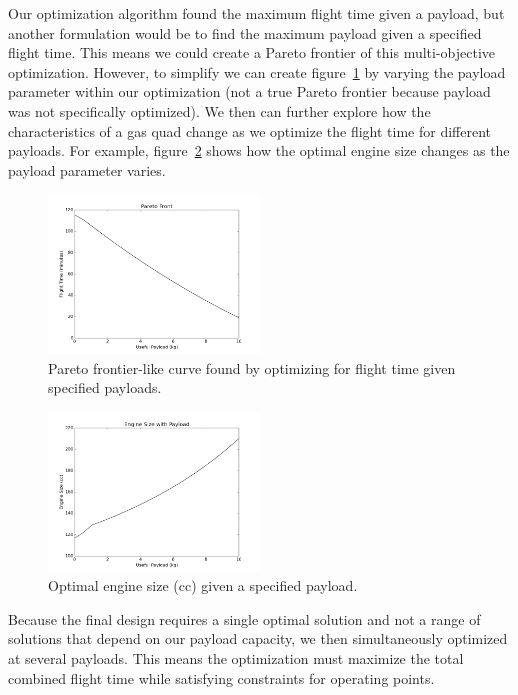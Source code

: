 \documentclass[letterpaper, 10 pt, conference]{ieeeconf}  %
\begin{document}
Our optimization algorithm found the maximum flight time given a payload, but another formulation would be to find the maximum payload given a specified flight time. This means we could create a Pareto frontier of this multi-objective optimization. However, to simplify we can create figure~\ref{fig:payload} by varying the payload parameter within our optimization (not a true Pareto frontier because payload was not specifically optimized). We then can further explore how the characteristics of a gas quad change as we optimize the flight time for different payloads. For example, figure~\ref{fig:eng_v_pl} shows how the optimal engine size changes as the payload parameter varies. 

\begin{figure}
	\includegraphics[width=0.5\textwidth]{pareto_front.png}
	\caption{Pareto frontier-like curve found by optimizing for flight time given specified payloads.}
		\label{fig:payload}
\end{figure}

\begin{figure}
	\includegraphics[width=0.5\textwidth]{engine_size_vs_payload.png}
	\caption{Optimal engine size (cc) given a specified payload.}
		\label{fig:eng_v_pl}
\end{figure}

Because the final design requires a single optimal solution and not a range of solutions that depend on our payload capacity, we then simultaneously optimized at several payloads. This means the optimization must maximize the total combined flight time while satisfying constraints for operating points.
\end{document}
